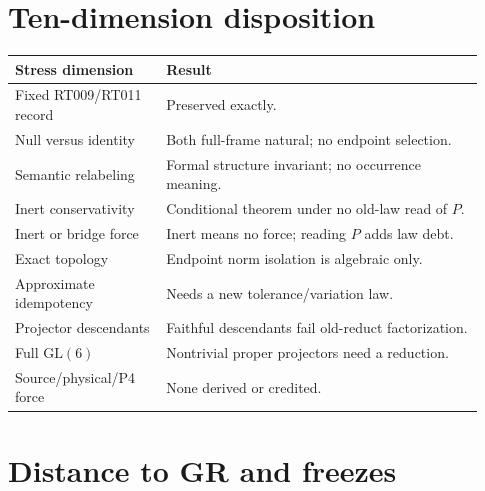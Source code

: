 \documentclass[11pt]{article}
\begin{document}
\section{Ten-dimension disposition}

\begin{longtable}{p{0.30\linewidth}p{0.63\linewidth}}
\toprule
Stress dimension & Result \\
\midrule
Fixed RT009/RT011 record & Preserved exactly. \\
Null versus identity & Both full-frame natural; no endpoint selection. \\
Semantic relabeling & Formal structure invariant; no occurrence meaning. \\
Inert conservativity & Conditional theorem under no old-law read of $P$. \\
Inert or bridge force & Inert means no force; reading $P$ adds law debt. \\
Exact topology & Endpoint norm isolation is algebraic only. \\
Approximate idempotency & Needs a new tolerance/variation law. \\
Projector descendants & Faithful descendants fail old-reduct factorization. \\
Full $\mathrm{GL}(6)$ & Nontrivial proper projectors need a reduction. \\
Source/physical/P4 force & None derived or credited. \\
\bottomrule
\end{longtable}

\section{Distance to GR and freezes}
\end{document}
